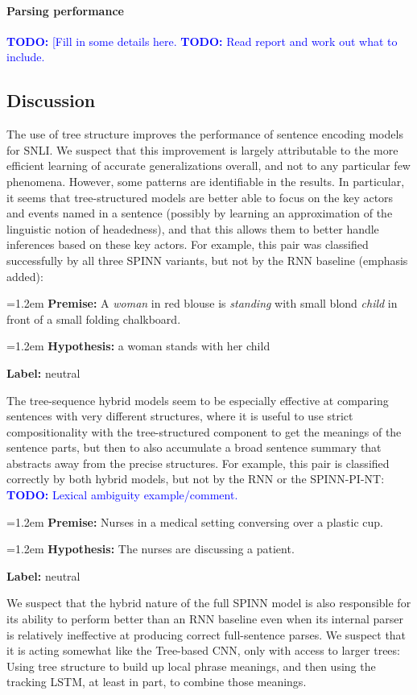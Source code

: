 \documentclass[11pt]{article}
\newcommand\todo[1]{\textcolor{blue}{\textbf{TODO:} #1}}
\newcommand{\snli}[3]{{\vspace{0.25em}
{\small \setlength{\parindent}{0.6em} \hangindent=1.2em  \textbf{Premise:} #1\par}\vspace{0.25em}
{\small \setlength{\parindent}{0.6em} \hangindent=1.2em   \textbf{Hypothesis:} #2\par}\vspace{0.25em}
{\small \setlength{\parindent}{0.6em}  \textbf{Label:} #3\par}
}}
\begin{document}
\paragraph{Parsing performance}

\todo{[Fill in some details here.}
\todo{Read report and work out what to include.}

\subsection{Discussion}

The use of tree structure improves the performance of sentence encoding models for SNLI. We suspect that this improvement is largely attributable to the more efficient learning of accurate generalizations overall, and not to any particular few phenomena. However, some patterns are identifiable in the results. In particular, it seems that tree-structured models are better able to focus on the key actors and events named in a sentence (possibly by learning an approximation of the linguistic notion of headedness), and that this allows them to better handle inferences based on these key actors. For example, this pair was classified successfully by all three SPINN variants, but not by the RNN baseline (emphasis added):

\snli
{A \textit{woman} in red blouse is \textit{standing} with small blond \textit{child} in front of a small folding chalkboard.}
{a woman stands with her child}
{neutral}

The tree-sequence hybrid models seem to be especially effective at comparing sentences with very different structures, where it is useful to use strict compositionality with the tree-structured component to get the meanings of the sentence parts, but then to also accumulate a broad sentence summary that abstracts away from the precise structures. For example, this pair is classified correctly by both hybrid models, but not by the RNN or the SPINN-PI-NT: \todo{Lexical ambiguity example/comment.}

\snli{Nurses in a medical setting conversing over a plastic cup.}
{The nurses are discussing a patient.}
{neutral}

We suspect that the hybrid nature of the full SPINN model is also responsible for its ability to perform better than an RNN baseline even when its internal parser is relatively ineffective at producing correct full-sentence parses. We suspect that it is acting somewhat like the Tree-based CNN, only with access to larger trees: Using tree structure to build up local phrase meanings, and then using the tracking LSTM, at least in part, to combine those meanings.
\end{document}

